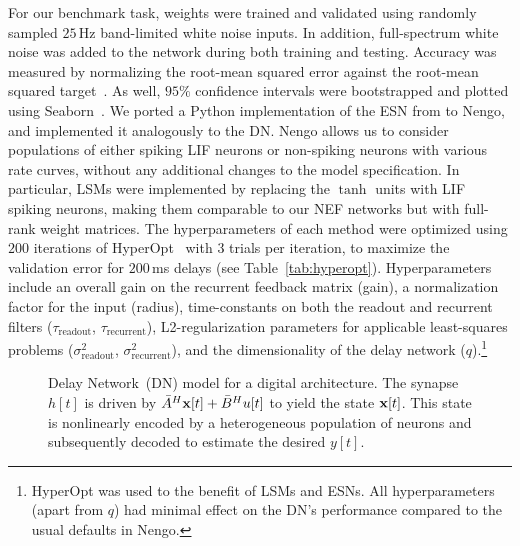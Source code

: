 For our benchmark task, weights were trained and validated using randomly sampled $25$\,Hz band-limited white noise inputs.
In addition, full-spectrum white noise was added to the network during both training and testing.
Accuracy was measured by normalizing the root-mean squared error against the root-mean squared target~\citep[NRMSE;][]{lukovsevicius2012reservoir}.
As well, $95\%$ confidence intervals were bootstrapped and plotted using Seaborn~\citep{michael_waskom_2015_19108}.
We ported a Python implementation of the ESN from \cite{lukovsevivcius2009reservoir} to Nengo, and implemented it analogously to the DN.
Nengo allows us to consider populations of either spiking LIF neurons or non-spiking neurons with various rate curves, without any additional changes to the model specification.
In particular, LSMs were implemented by replacing the $\tanh$ units with LIF spiking neurons, making them comparable to our NEF networks but with full-rank weight matrices.
The hyperparameters of each method were optimized using $200$ iterations of HyperOpt~\citep{bergstra2013making} with $3$ trials per iteration, to maximize the validation error for $200$\,ms delays (see Table~\ref{tab:hyperopt}).
Hyperparameters include an overall gain on the recurrent feedback matrix (gain), a normalization factor for the input (radius), time-constants on both the readout and recurrent filters ($\tau_\text{readout}$, $\tau_\text{recurrent}$), L2-regularization parameters for applicable least-squares problems ($\sigma^2_\text{readout}$, $\sigma^2_\text{recurrent}$), and the dimensionality of the delay network ($q$).\footnote{%
HyperOpt was used to the benefit of LSMs and ESNs. All hyperparameters (apart from $q$) had minimal effect on the DN's performance compared to the usual defaults in Nengo.}

\begin{figure}
\centering
  \caption{ \label{fig:delay-architecture}
    Delay Network~(DN) model for a digital architecture.
    The synapse $h[t]$ is driven by $\bar{A}^H \mathbf{x}[t] + \bar{B}^H u[t]$ to yield the state $\mathbf{x}[t]$.
    This state is nonlinearly encoded by a heterogeneous population of neurons and subsequently decoded to estimate the desired $y[t]$.
  } 
\end{figure}

